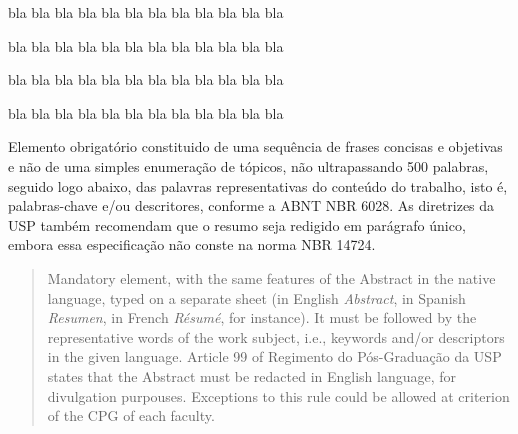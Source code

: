 \documentclass[12pt,a4paper,espaco=umemeio,noindentfirst,oneside,openany,tocpage=plain,pnumromarab,ruledheader,time,anapcustomindent]{sty/abnt}
\begin{document}
\folhaderosto
\folhaderostoreverso

\folhadeaprovacao



bla bla bla bla bla bla bla bla bla bla bla bla

bla bla bla bla bla bla bla bla bla bla bla bla


bla bla bla bla bla bla bla bla bla bla bla bla

bla bla bla bla bla bla bla bla bla bla bla bla

\begin{resumo}
Elemento obrigatório constituido de uma sequência de frases concisas e
objetivas e não de uma simples enumeração de tópicos, não
ultrapassando 500 palabras, seguido logo abaixo, das palavras
representativas do conteúdo do trabalho, isto é, palabras-chave e/ou
descritores, conforme a ABNT NBR 6028. As diretrizes da USP também
recomendam que o resumo seja redigido em parágrafo único, embora essa
especificação não conste na norma NBR 14724.

\makekeywords
\end{resumo}

\renewcommand{\ABNTabstractname}{Résumé}
\begin{abstract}
Mandatory element, with the same features of the Abstract in the
native language, typed on a separate sheet (in English
\emph{Abstract}, in Spanish \emph{Resumen}, in French \emph{Résumé},
for instance). It must be followed by the representative words of the
work subject, i.e., keywords and/or descriptors in the given
language. Article 99 of Regimento do Pós-Graduação da USP states that
the Abstract must be redacted in English language, for divulgation
purpouses. Exceptions to this rule could be allowed at criterion of
the CPG of each faculty.

\makekeywords
\end{abstract}
\end{document}
